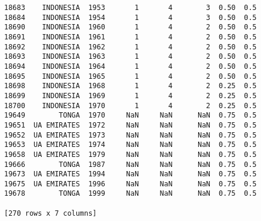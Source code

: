 \documentclass[12pt,fleqn]{article}\usepackage{common}
\begin{document}
\begin{verbatim}
18683    INDONESIA  1953       1       4        3  0.50  0.5
18684    INDONESIA  1954       1       4        3  0.50  0.5
18690    INDONESIA  1960       1       4        2  0.50  0.5
18691    INDONESIA  1961       1       4        2  0.50  0.5
18692    INDONESIA  1962       1       4        2  0.50  0.5
18693    INDONESIA  1963       1       4        2  0.50  0.5
18694    INDONESIA  1964       1       4        2  0.50  0.5
18695    INDONESIA  1965       1       4        2  0.50  0.5
18698    INDONESIA  1968       1       4        2  0.25  0.5
18699    INDONESIA  1969       1       4        2  0.25  0.5
18700    INDONESIA  1970       1       4        2  0.25  0.5
19649        TONGA  1970     NaN     NaN      NaN  0.75  0.5
19651  UA EMIRATES  1972     NaN     NaN      NaN  0.75  0.5
19652  UA EMIRATES  1973     NaN     NaN      NaN  0.75  0.5
19653  UA EMIRATES  1974     NaN     NaN      NaN  0.75  0.5
19658  UA EMIRATES  1979     NaN     NaN      NaN  0.75  0.5
19666        TONGA  1987     NaN     NaN      NaN  0.75  0.5
19673  UA EMIRATES  1994     NaN     NaN      NaN  0.75  0.5
19675  UA EMIRATES  1996     NaN     NaN      NaN  0.75  0.5
19678        TONGA  1999     NaN     NaN      NaN  0.75  0.5

[270 rows x 7 columns]
\end{verbatim}
\end{document}
